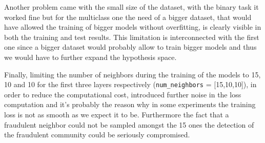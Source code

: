 Another problem came with the small size of the dataset, with the binary task it worked fine but for the multiclass one the need of a bigger dataset, that would have allowed the training of bigger models without overfitting, is clearly visible in both the training and test results.
This limitation is interconnected with the first one since a bigger dataset would probably allow to train bigger models and thus we would have to further expand the hypothesis space.

Finally, limiting the number of neighbors during the training of the models to 15, 10 and 10 for the first three layers respectively (\texttt{num\_neighbors} = [15,10,10]), in order to reduce the computational cost, introduced further noise in the loss computation and it's probably the reason why in some experiments the training loss is not as smooth as we expect it to be. Furthermore the fact that a fraudulent neighbor could not be sampled amongst the 15 ones the detection of the fraudulent community could be seriously compromised. 
